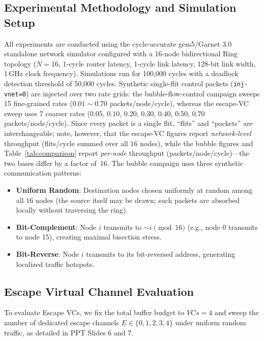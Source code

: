 \documentclass[10pt,journal,compsoc]{IEEEtran}
\begin{document}
\subsection{Experimental Methodology and Simulation Setup}
All experiments are conducted using the cycle-accurate gem5/Garnet 3.0~\cite{gem5} standalone network simulator configured with a 16-node bidirectional Ring topology ($N=16$, 1-cycle router latency, 1-cycle link latency, 128-bit link width, 1\,GHz clock frequency). Simulations run for 100,000 cycles with a deadlock detection threshold of 50,000 cycles. Synthetic single-flit control packets (\texttt{inj-vnet=0}) are injected over two rate grids: the bubble-flow-control campaign sweeps 15 fine-grained rates ($0.01 \sim 0.70$ packets/node/cycle), whereas the escape-VC sweep uses 7 coarser rates ($0.05$, $0.10$, $0.20$, $0.30$, $0.40$, $0.50$, $0.70$ packets/node/cycle). Since every packet is a single flit, ``flits'' and ``packets'' are interchangeable; note, however, that the escape-VC figures report \emph{network-level} throughput (flits/cycle summed over all $16$ nodes), while the bubble figures and Table~\ref{tab:comparison} report \emph{per-node} throughput (packets/node/cycle)---the two bases differ by a factor of~$16$. The bubble campaign uses three synthetic communication patterns:
\begin{itemize}
    \item \textbf{Uniform Random}: Destination nodes chosen uniformly at random among all $16$ nodes (the source itself may be drawn; such packets are absorbed locally without traversing the ring).
    \item \textbf{Bit-Complement}: Node $i$ transmits to $\sim i \pmod{16}$ (e.g., node 0 transmits to node 15), creating maximal bisection stress.
    \item \textbf{Bit-Reverse}: Node $i$ transmits to its bit-reversed address, generating localized traffic hotspots.
\end{itemize}

\subsection{Escape Virtual Channel Evaluation}
To evaluate Escape VCs, we fix the total buffer budget to $VCs=4$ and sweep the number of dedicated escape channels $E \in \{0, 1, 2, 3, 4\}$ under uniform random traffic, as detailed in PPT Slides 6 and 7.
\end{document}
